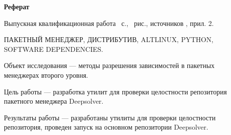 \begin{center}
	\textbf{Реферат}
\end{center}

Выпускная квалификационная работа ~с., ~рис., источников , прил. 2.

ПАКЕТНЫЙ МЕНЕДЖЕР, ДИСТРИБУТИВ, ALTLINUX, PYTHON, SOFTWARE DEPENDENCIES.

Объект исследования --- методы разрешения зависимостей в пакетных менеджерах второго уровня.

Цель работы --- разработка утилит для проверки целостности репозитория пакетного менеджера Deepsolver.

Результаты работы --- разработаны утилиты для проверки целостности репозитория, проведен запуск
на основном репозитории Deepsolver.

